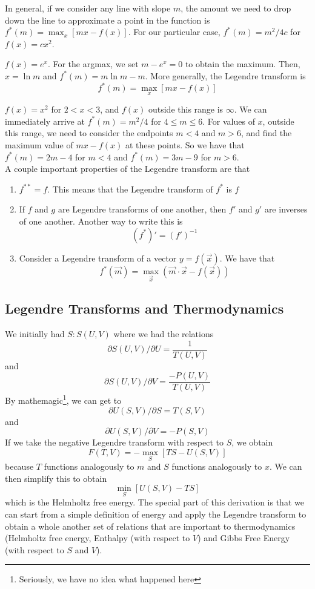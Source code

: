 \documentclass[11pt]{article}
\theoremstyle{definition}
\begin{document}
In general, if we consider any line with slope $m$, the amount we need to drop down the line to approximate a point in the function is $f^*(m) = \max_x [mx - f(x)]$. For our particular case, $f^*(m) = m^2/4c$ for $f(x) = cx^2$. 

 $f(x) = e^x$. For the argmax, we set $m - e^x = 0$ to obtain the maximum. Then, $x = \ln m$ and $f^*(m) = m \ln m - m$.  More generally, the Legendre transform is $$f^*(m) = \max_x [mx - f(x)]$$

\example $f(x) = x^2$ for $2 < x < 3$, and $f(x)$ outside this range is $\infty$. We can immediately arrive at $f^*(m) = m^2 / 4$ for $4 \leq m \leq 6$. For values of $x$, outside this range, we need to consider the endpoints $m <4$ and $m > 6$, and find the maximum value of $mx - f(x)$ at these points. So we have that $f^*(m) = 2m-4$ for $m < 4$ and $f^*(m) = 3m-9$ for $m > 6$. \\

\noindent A couple important properties of the Legendre transform are that
\begin{enumerate}
\item $f^{**} = f$. This means that the Legendre transform of $f^*$ is $f$
\item If $f$ and $g$ are Legendre transforms of one another, then $f'$ and $g'$ are inverses of one another. Another way to write this is $$(f^*)' =(f')^{-1}$$
\item Consider a Legendre transform of a vector $y = f(\vec{x})$. We have that $$f^*(\vec{m}) = \max_{\vec{x}} (\vec{m} \cdot \vec{x} - f(\vec{x}))$$
\end{enumerate}

\subsection{Legendre Transforms and Thermodynamics}

We initially had $S : S(U, V)$ where we had the relations $$\partial S(U, V)/ \partial U = \frac{1}{T(U, V)}$$ and $$\partial S(U, V) / \partial V = \frac{-P(U, V)}{T(U, V)}$$By mathemagic\footnote{Seriously, we have no idea what happened here}, we can get to $$\partial U(S, V) / \partial S = T(S, V)$$ and $$\partial U(S, V) / \partial V = -P(S, V)$$If we take the negative Legendre transform with respect to $S$, we obtain $$F(T, V) = -\max_S [TS - U(S, V)]$$ because $T$ functions analogously to $m$ and $S$ functions analogously to $x$. We can then simplify this to obtain $$\min_S [U(S, V) - TS]$$ which is the Helmholtz free energy. The special part of this derivation is that we can start from a simple definition of energy and apply the Legendre transform to obtain a whole another set of relations that are important to thermodynamics (Helmholtz free energy, Enthalpy (with respect to $V$) and Gibbs Free Energy (with respect to $S$ and $V$). 
\end{document}
